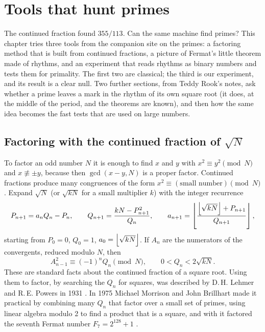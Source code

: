 \chapter{Tools that hunt primes}\label{ch:tools}

The continued fraction found $355/113$. Can the same machine find primes? This chapter tries three tools from the companion site on the primes: a factoring method that is built from continued fractions, a picture of Fermat's little theorem made of rhythms, and an experiment that reads rhythms as binary numbers and tests them for primality. The first two are classical; the third is our experiment, and its result is a clear null. Two further sections, from Teddy Rook's notes, ask whether a prime leaves a mark in the rhythm of its own square root (it does, at the middle of the period, and the theorems are known), and then how the same idea becomes the fast tests that are used on large numbers. \addedon{\revG}

\section{Factoring with the continued fraction of \texorpdfstring{$\sqrt N$}{sqrt N}}\label{sec:cfrac-factoring}

To factor an odd number $N$ it is enough to find $x$ and $y$ with $x^2 \equiv y^2 \pmod N$ and $x \not\equiv \pm y$, because then $\gcd(x - y, N)$ is a proper factor. Continued fractions produce many congruences of the form $x^2 \equiv (\text{small number}) \pmod N$. Expand $\sqrt{N}$ (or $\sqrt{kN}$ for a small multiplier $k$) with the integer recurrence
\begin{equation}\label{eq:cfrac}
  P_{n+1} = a_n Q_n - P_n, \qquad Q_{n+1} = \frac{kN - P_{n+1}^2}{Q_n}, \qquad a_{n+1} = \left\lfloor \frac{\left\lfloor \sqrt{kN}\right\rfloor + P_{n+1}}{Q_{n+1}}\right\rfloor,
\end{equation}
starting from $P_0 = 0$, $Q_0 = 1$, $a_0 = \left\lfloor \sqrt{kN}\right\rfloor$. If $A_n$ are the numerators of the convergents, reduced modulo $N$, then
\begin{equation}\label{eq:cfrac-congruence}
  A_{n-1}^2 \equiv (-1)^n Q_n \pmod N, \qquad 0 < Q_n < 2\sqrt{kN}.
\end{equation}
These are standard facts about the continued fraction of a square root. Using them to factor, by searching the $Q_n$ for squares, was described by D.\,H. Lehmer and R.\,E. Powers in 1931 \citep{LehmerPowers1931}. In 1975 Michael Morrison and John Brillhart made it practical by combining many $Q_n$ that factor over a small set of primes, using linear algebra modulo 2 to find a product that is a square, and with it factored the seventh Fermat number $F_7 = 2^{128} + 1$ \citep{MorrisonBrillhart1975}.


